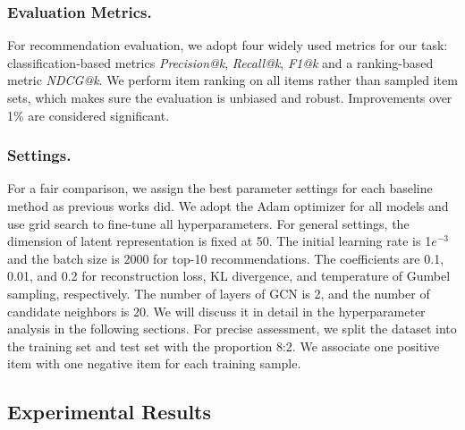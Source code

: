 \documentclass[letterpaper]{article} %
\begin{document}
\subsubsection{Evaluation Metrics.}
For recommendation evaluation, we adopt four widely used metrics for our task: classification-based metrics \textit{Precision@k}, \textit{Recall@k}, \textit{F1@k} and a ranking-based metric \textit{NDCG@k}. We perform item ranking on all items rather than sampled item sets, which makes sure the evaluation is unbiased and robust. Improvements over 1\% are considered significant.

\subsubsection{Settings.}
For a fair comparison, we assign the best parameter settings for each baseline method as previous works did. We adopt the Adam optimizer for all models and use grid search to fine-tune all hyperparameters. For general settings, the dimension of latent representation is fixed at 50. The initial learning rate is 1$e^{-3}$ and the batch size is 2000 for top-10 recommendations. The coefficients are 0.1, 0.01, and 0.2 for reconstruction loss, KL divergence, and temperature of Gumbel sampling, respectively. The number of layers of GCN is 2, and the number of candidate neighbors is 20. We will discuss it in detail in the hyperparameter analysis in the following sections. For precise assessment, we split the dataset into the training set and test set with the proportion 8:2. We associate one positive item with one negative item for each training sample.

\subsection{Experimental Results}
\end{document}
